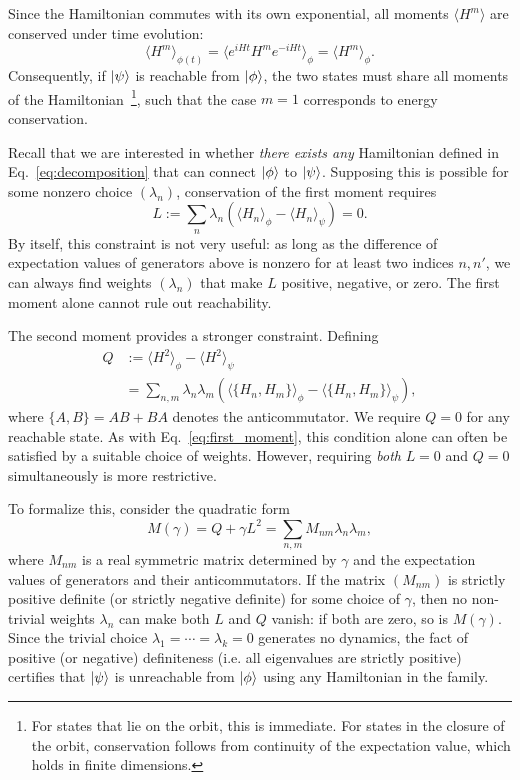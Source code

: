 \documentclass[aps,prx,reprint,superscriptaddress,footnote, twocolumn,notitlepage]{revtex4-2}
\begin{document}
Since the Hamiltonian commutes with its own exponential, all moments $\langle H^m \rangle$ are conserved under time evolution:
\begin{equation}
    \langle H^m \rangle_{\phi(t)} = \langle e^{iHt} H^m e^{-iHt} \rangle_\phi = \langle H^m \rangle_\phi.
\end{equation}
Consequently, if $\ket{\psi}$ is reachable from $\ket{\phi}$, the two states must share all moments of the Hamiltonian~\footnote{For states that lie on the orbit, this is immediate. For states in the closure of the orbit, conservation follows from continuity of the expectation value, which holds in finite dimensions.}, such that the case $m=1$ corresponds to energy conservation.

Recall that we are interested in whether \emph{there exists any} Hamiltonian defined in Eq.~\eqref{eq:decomposition} that can connect $\ket{\phi}$ to $\ket{\psi}$. Supposing this is possible for some nonzero choice $(\lambda_n)$, conservation of the first moment requires
\begin{equation}
    L := \sum_n \lambda_n \left( \langle H_n \rangle_\phi - \langle H_n \rangle_\psi \right) = 0.
    \label{eq:first_moment}
\end{equation}
By itself, this constraint is not very useful: as long as the difference of expectation values of  generators above is nonzero for at least two indices $n, n'$, we can always find weights $(\lambda_n)$ that make $L$ positive, negative, or zero. The first moment alone cannot rule out reachability.

The second moment provides a stronger constraint. Defining
\begin{equation}\begin{aligned}
    Q &:= \langle H^2 \rangle_\phi - \langle H^2 \rangle_\psi \\
    &= \sum_{n,m} \lambda_n \lambda_m \left( \langle \{H_n, H_m\} \rangle_\phi - \langle \{H_n, H_m\} \rangle_\psi \right),
    \end{aligned}
\end{equation}
where $\{A, B\} = AB + BA$ denotes the anticommutator. We require $Q = 0$ for any reachable state. As with Eq.~\eqref{eq:first_moment}, this condition alone can often be satisfied by a suitable choice of weights. However, requiring \emph{both} $L = 0$ and $Q = 0$ simultaneously is more restrictive.

To formalize this, consider the quadratic form
\begin{equation}
    M(\gamma) = Q + \gamma L^2 = \sum_{n,m} M_{nm} \lambda_n \lambda_m,
\end{equation}
where $M_{nm}$ is a real symmetric matrix determined by $\gamma$ and the expectation values of generators and their anticommutators. If the matrix $(M_{nm})$ is strictly positive definite (or strictly negative definite) for some choice of $\gamma$, then no non-trivial weights $\lambda_n$ can make both $L$ and $Q$ vanish: if both are zero, so is $M(\gamma)$. Since the trivial choice $\lambda_1 = \cdots = \lambda_k = 0$ generates no dynamics, the fact of positive (or negative) definiteness (i.e. all eigenvalues are strictly positive) certifies that $\ket{\psi}$ is unreachable from $\ket{\phi}$ using any Hamiltonian in the family.
\end{document}
